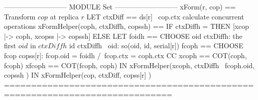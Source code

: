 \documentclass[preview, border={5pt 0pt 32pt 1pt}]{standalone}
\newcommand{\cc}{\textsc{CC}}
\begin{document}
\begin{tla}
--------------------------- MODULE Set ---------------------------
xForm(r, cop) == \* Transform $cop$ at replica $r$
    LET ctxDiff == ds[r] \ cop.ctx \* calculate concurrent operations
        xFormHelper(coph, ctxDiffh, copssh) ==
            IF ctxDiffh = {} THEN [xcop |-> coph, xcopss |-> copssh]
            ELSE LET foidh == CHOOSE oid \in ctxDiffh: \* the first $oid$ in $ctxDiffh$ 
                                \A id \in ctxDiffh \ {oid}: so(oid, id, serial[r]) 
                     fcoph == CHOOSE fcop \in copss[r]: 
                                fcop.oid = foidh /\ fcop.ctx = coph.ctx \* \cc
                     xcoph == COT(coph, fcoph)    xfcoph == COT(fcoph, coph)
                 IN  xFormHelper(xcoph, ctxDiffh \ {fcoph.oid}, 
                                        copssh )
    IN  xFormHelper(cop, ctxDiff, copss[r] ) 
=============================================================================
\end{tla}
\begin{tlatex}
\@x{}\moduleLeftDash{}\moduleRightDash\@xx{}%
%
%
\@xx{}%
%
\@xx{}%
%
%
\@xx{}%
%
\@y{%
  \cc
}%
\@xx{}%
%
\@x{}\bottombar\@xx{}%
\end{tlatex}
\end{document}
